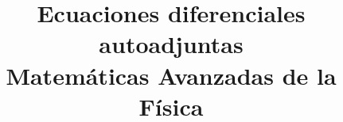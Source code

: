 
\usepackage{mathrsfs}
\newcommand{\doblederivaday}[1]{#1^{\prime \prime}}
\newcommand{\derivaday}[1]{#1^{\prime}}
\newcommand{\dderivadacociente}[2]{\dfrac{d^{2} #1}{d #2^{2}}}
\newcommand{\derivadacociente}[2]{\dfrac{d {#1}}{d #2}}
\title{Ecuaciones diferenciales autoadjuntas \\ {\large Matemáticas Avanzadas de la Física}}
\date{ }

\renewcommand\labelenumii{\theenumi.{\arabic{enumii}}}
\maketitle
\fontsize{14}{14}\selectfont
